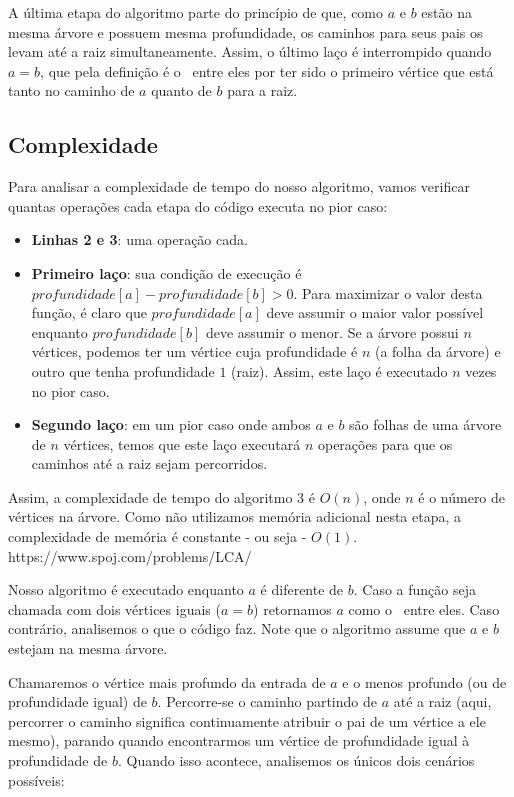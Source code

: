 A última etapa do algoritmo parte do princípio de que, como $a$ e $b$ estão na mesma árvore e possuem mesma profundidade, os caminhos para seus pais os levam até a raiz simultaneamente. Assim, o último laço é interrompido quando $a = b$, que pela definição é o \LCA\ entre eles por ter sido o primeiro vértice que está tanto no caminho de $a$ quanto de $b$ para a raiz.


\subsection{Complexidade}

Para analisar a complexidade de tempo do nosso algoritmo, vamos verificar quantas operações cada etapa do código executa no pior caso:

\begin{itemize}
    \item \textbf{Linhas 2 e 3}: uma operação cada.
    \item \textbf{Primeiro laço}: sua condição de execução é $profundidade[a] - profundidade[b] > 0$. Para maximizar o valor desta função, é claro que $profundidade[a]$ deve assumir o maior valor possível enquanto $profundidade[b]$ deve assumir o menor. Se a árvore possui $n$ vértices, podemos ter um vértice cuja profundidade é $n$ (a folha da árvore) e outro que tenha profundidade $1$ (raiz). Assim, este laço é executado $n$ vezes no pior caso.
    \item \textbf{Segundo laço}: em um pior caso onde ambos $a$ e $b$ são folhas de uma árvore de $n$ vértices, temos que este laço executará $n$ operações para que os caminhos até a raiz sejam percorridos.
\end{itemize}

Assim, a complexidade de tempo do algoritmo 3 é $O(n)$, onde $n$ é o número de vértices na árvore. Como não utilizamos memória adicional nesta etapa, a complexidade de memória é constante - ou seja - $O(1)$. https://www.spoj.com/problems/LCA/




\iffalse
Nosso algoritmo é executado enquanto $a$ é diferente de $b$. Caso a função seja chamada com dois vértices iguais ($a = b$) retornamos $a$ como o \LCA\ entre eles. Caso contrário, analisemos o que o código faz. Note que o algoritmo assume que $a$ e $b$ estejam na mesma árvore.

Chamaremos o vértice mais profundo da entrada de $a$ e o menos profundo (ou de profundidade igual) de $b$. Percorre-se o caminho partindo de $a$ até a raiz (aqui, percorrer o caminho significa continuamente atribuir o pai de um vértice a ele mesmo), parando quando encontrarmos um vértice de profundidade igual à profundidade de $b$. Quando isso acontece, analisemos os únicos dois cenários possíveis:

